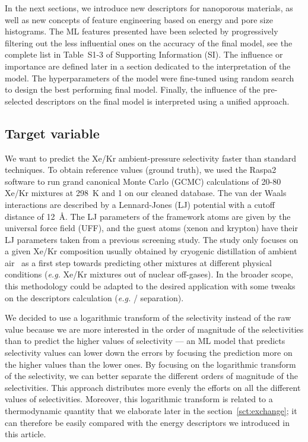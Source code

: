 \documentclass[main]{subfiles}
\begin{document}
In the next sections, we introduce new descriptors for nanoporous materials, as well as new concepts of feature engineering based on energy and pore size histograms. The ML features presented have been selected by progressively filtering out the less influential ones on the accuracy of the final model, see the complete list in Table~S1-3 of Supporting Information (SI). The influence or importance are defined later in a section dedicated to the interpretation of the model. The hyperparameters of the model were fine-tuned using random search to design the best performing final model. Finally, the influence of the pre-selected descriptors on the final model is interpreted using a unified approach.

\subsection{Target variable}

We want to predict the Xe/Kr ambient-pressure selectivity faster than standard techniques. To obtain reference values (ground truth), we used the Raspa2 software\cite{dubbeldam2016} to run grand canonical Monte Carlo (GCMC) calculations of 20-80 Xe/Kr mixtures at \SI{298}{\kelvin} and \SI{1}{\atm} on our cleaned database. The van der Waals interactions are described by a Lennard-Jones (LJ) potential with a cutoff distance of \SI{12}{\angstrom}. The LJ parameters of the framework atoms are given by the universal force field (UFF),\cite{rappe1992} and the guest atoms (xenon and krypton) have their LJ parameters taken from a previous screening study.\cite{Ryan_2010} The study only focuses on a given Xe/Kr composition usually obtained by cryogenic distillation of ambient air~\cite{kerry2007industrial} as a first step towards predicting other mixtures at different physical conditions (\emph{e.g.} Xe/Kr mixtures out of nuclear off-gases). In the broader scope, this methodology could be adapted to the desired application with some tweaks on the descriptors calculation (\emph{e.g.} / separation).

We decided to use a logarithmic transform of the selectivity instead of the raw value because we are more interested in the order of magnitude of the selectivities than to predict the higher values of selectivity --- an ML model that predicts selectivity values can lower down the errors by focusing the prediction more on the higher values than the lower ones. By focusing on the logarithmic transform of the selectivity, we can better separate the different orders of magnitude of the selectivities. This approach distributes more evenly the efforts on all the different values of selectivities. Moreover, this logarithmic transform is related to a thermodynamic quantity that we elaborate later in the section~\ref{sct:exchange}; it can therefore be easily compared with the energy descriptors we introduced in this article.
\end{document}
